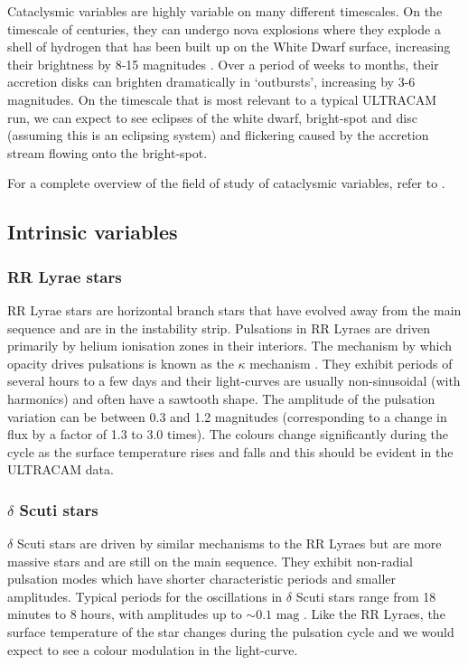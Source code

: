 Cataclysmic variables are highly variable on many different timescales. On the timescale of centuries, they can undergo nova explosions where they explode a shell of hydrogen that has been built up on the White Dwarf surface, increasing their brightness by 8-15 magnitudes \citep{HellierBook}. Over a period of weeks to months, their accretion disks can brighten dramatically in `outbursts', increasing by 3-6 magnitudes. On the timescale that is most relevant to a typical ULTRACAM run, we can expect to see eclipses of the white dwarf, bright-spot and disc (assuming this is an eclipsing system) and flickering caused by the accretion stream flowing onto the bright-spot. 

For a complete overview of the field of study of cataclysmic variables, refer to \citet{WarnerBook}. 

\subsection{Intrinsic variables}

\subsubsection{RR Lyrae stars}
RR Lyrae stars are horizontal branch stars that have evolved away from the main sequence and are in the instability strip. Pulsations in RR Lyraes are driven primarily by helium ionisation zones in their interiors. The mechanism by which opacity drives pulsations is known as the $\kappa$ mechanism \citep{asteroseismology}. They exhibit periods of several hours to a few days and their light-curves are usually non-sinusoidal (with harmonics) and often have a sawtooth shape. The amplitude of the pulsation variation can be between 0.3 and 1.2 magnitudes (corresponding to a change in flux by a factor of 1.3 to 3.0 times). The colours change significantly during the cycle as the surface temperature rises and falls and this should be evident in the ULTRACAM data. 

\subsubsection{$\delta$ Scuti stars}
$\delta$ Scuti stars are driven by similar mechanisms to the RR Lyraes but are more massive stars and are still on the main sequence. They exhibit non-radial pulsation modes which have shorter characteristic periods and smaller amplitudes. Typical periods for the oscillations in $\delta$ Scuti stars range from 18 minutes to 8 hours, with amplitudes up to $\sim \mbox{0.1 mag}$ \citep{KurtzBook}. Like the RR Lyraes, the surface temperature of the star changes during the pulsation cycle and we would expect to see a colour modulation in the light-curve. 

